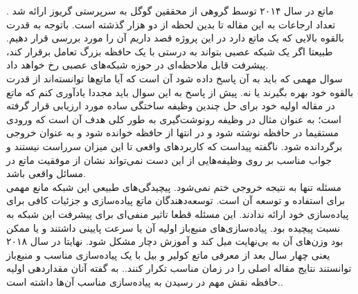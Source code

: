 ماتع در سال ۲۰۱۴ توسط گروهی از محققین گوگل به سرپرستی گریوز ارائه شد \cite{graves2014neural}. تعداد ارجاعات به این مقاله تا بدین لحظه از دو هزار گذشته است. باتوجه به قدرت بالقوه‌ بالایی که یک ماتع دارد در این پروژه قصد داریم آن را مورد بررسی قرار دهیم. طبیعتا اگر یک شبکه عصبی بتواند به درستی با یک حافظه بزرگ تعامل برقرار کند، پیشرفت قابل ملاحظه‌ای در حوزه شبکه‌های عصبی رخ خواهد داد.
\\

سوال مهمی که باید به آن پاسخ داده شود آن است که آیا ماتع‌ها توانسته‌اند از قدرت بالقوه خود بهره بگیرند یا نه. پیش از پاسخ به این سوال باید مجددا یادآوری کنم که ماتع در مقاله اولیه خود برای حل چندین وظیفه ساختگی ساده مورد ارزیابی قرار گرفته است؛ به عنوان مثال در وظیفه رونوشت‌گیری به طور کلی هدف آن است که ورودی مستقیما در حافظه نوشته شود و در انتها از حافظه خوانده شود و به عنوان خروجی برگردانده شود. ناگفته پیداست که کاربردهای واقعی تا این میزان سرراست نیستند و جواب مناسب بر روی وظیفه‌هایی از این دست نمی‌تواند نشان از موفقیت ماتع در مسائل واقعی باشد.
\\

مسئله تنها به نتیجه خروجی ختم نمی‌شود. پیچیدگی‌های طبیعی این شبکه مانع مهمی برای استفاده و توسعه آن است. توسعه‌دهندگان ماتع پیاده‌سازی و جزئیات کافی برای پیاده‌سازی خود ارائه ندادند\cite{collier2018implementing}. این مسئله قطعا تاثیر منفی‌ای برای پیشرفت این شبکه به نسبت پیچیده بود. پیاده‌سازی‌های منبع‌باز اولیه آن یا سرعت پایینی داشتند و یا ممکن بود وزن‌های آن به بی‌نهایت میل کند و آموزش دچار مشکل شود. نهایتا در سال ۲۰۱۸ یعنی چهار سال بعد از معرفی ماتع کولیر و بیل  با یک پیاده‌سازی مناسب و منبع‌باز توانستند نتایج مقاله اصلی را در زمان مناسب تکرار کنند.\cite{collier2018implementing}. به گفته آنان مقداردهی اولیه حافظه نقش مهم در رسیدن به پیاده‌سازی مناسب آن‌ها داشته است.\cite{collier2018implementing}.
\\

